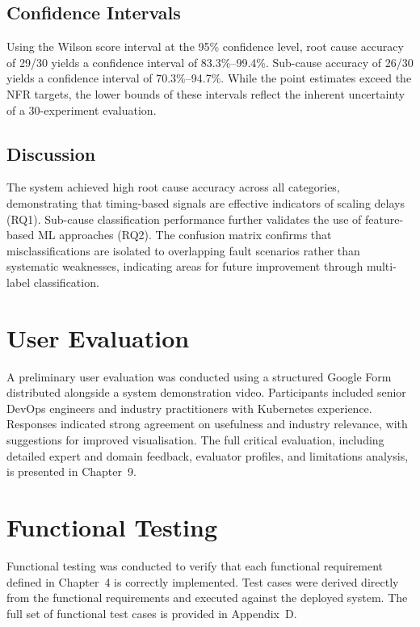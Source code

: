 \subsection{Confidence Intervals}
Using the Wilson score interval at the 95\% confidence level, root cause accuracy of 29/30 yields a confidence interval of 83.3\%--99.4\%. Sub-cause accuracy of 26/30 yields a confidence interval of 70.3\%--94.7\%. While the point estimates exceed the NFR targets, the lower bounds of these intervals reflect the inherent uncertainty of a 30-experiment evaluation.

\subsection{Discussion}
The system achieved high root cause accuracy across all categories, demonstrating that timing-based signals are effective indicators of scaling delays (RQ1). Sub-cause classification performance further validates the use of feature-based ML approaches (RQ2). The confusion matrix confirms that misclassifications are isolated to overlapping fault scenarios rather than systematic weaknesses, indicating areas for future improvement through multi-label classification.

\section{User Evaluation}
A preliminary user evaluation was conducted using a structured Google Form distributed alongside a system demonstration video. Participants included senior DevOps engineers and industry practitioners with Kubernetes experience. Responses indicated strong agreement on usefulness and industry relevance, with suggestions for improved visualisation. The full critical evaluation, including detailed expert and domain feedback, evaluator profiles, and limitations analysis, is presented in Chapter~9.

\section{Functional Testing}
Functional testing was conducted to verify that each functional requirement defined in Chapter~4 is correctly implemented. Test cases were derived directly from the functional requirements and executed against the deployed system. The full set of functional test cases is provided in Appendix~D.

